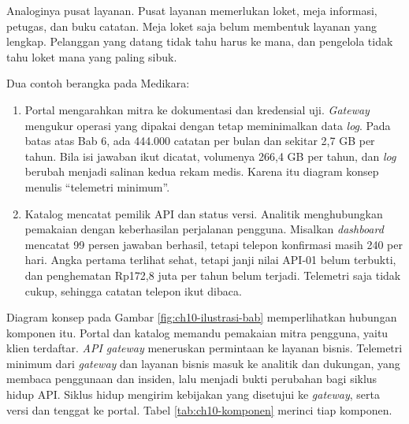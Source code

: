 Analoginya pusat layanan. Pusat layanan memerlukan loket, meja informasi, petugas, dan buku catatan. Meja loket saja
belum membentuk layanan yang lengkap. Pelanggan yang datang tidak tahu harus ke mana, dan pengelola tidak tahu loket
mana yang paling sibuk.

Dua contoh berangka pada Medikara:
\begin{enumerate}
  \item Portal mengarahkan mitra ke dokumentasi dan kredensial uji. \textit{Gateway} mengukur operasi yang dipakai
        dengan tetap meminimalkan data \textit{log}. Pada batas atas Bab 6, ada 444.000 catatan per bulan dan sekitar
        2,7 GB per tahun. Bila isi jawaban ikut dicatat, volumenya 266,4 GB per tahun, dan \textit{log} berubah menjadi
        salinan kedua rekam medis. Karena itu diagram konsep menulis ``telemetri minimum''.
  \item Katalog mencatat pemilik API dan status versi. Analitik menghubungkan pemakaian dengan keberhasilan perjalanan
        pengguna. Misalkan \textit{dashboard} mencatat 99 persen jawaban berhasil, tetapi telepon konfirmasi masih 240
        per hari. Angka pertama terlihat sehat, tetapi janji nilai API-01 belum terbukti, dan penghematan Rp172,8 juta
        per tahun belum terjadi. Telemetri saja tidak cukup, sehingga catatan telepon ikut dibaca.
\end{enumerate}

Diagram konsep pada Gambar \ref{fig:ch10-ilustrasi-bab} memperlihatkan hubungan komponen itu. Portal dan katalog memandu
pemakaian mitra pengguna, yaitu klien terdaftar. \textit{API gateway} meneruskan permintaan ke layanan bisnis. Telemetri
minimum dari \textit{gateway} dan layanan bisnis masuk ke analitik dan dukungan, yang membaca penggunaan dan insiden, lalu menjadi bukti perubahan bagi siklus hidup
API. Siklus hidup mengirim kebijakan yang disetujui ke \textit{gateway}, serta versi dan tenggat ke portal. Tabel
\ref{tab:ch10-komponen} merinci tiap komponen.

